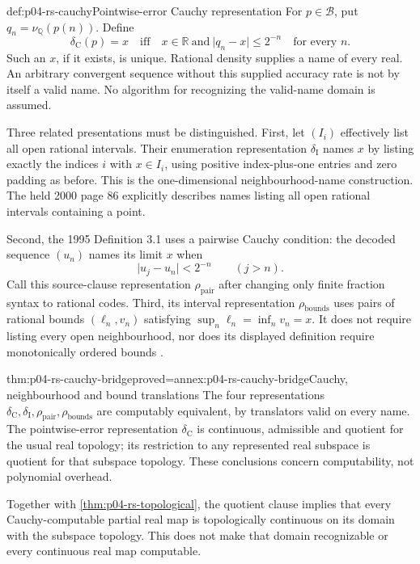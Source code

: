 \begin{hbdefinition}{def:p04-rs-cauchy}{Pointwise-error Cauchy representation}
For \(p\in\mathcal B\), put \(q_n=\nu_{\mathbb Q}(p(n))\).
Define
\[
 \delta_{\mathrm C}(p)=x
 \quad\text{iff}\quad
 x\in\mathbb R\ \text{and}\
 \lvert q_n-x\rvert\leq2^{-n}\quad\text{for every }n.
\]
Such an \(x\), if it exists, is unique. Rational density supplies
a name of every real. An arbitrary convergent sequence without
this supplied accuracy rate is not by itself a valid name.
No algorithm for recognizing the valid-name domain is assumed.
\end{hbdefinition}

Three related presentations must be distinguished.
First, let \((I_i)\) effectively list all open rational intervals.
Their enumeration representation \(\delta_{\mathrm I}\) names \(x\)
by listing exactly the indices \(i\) with \(x\in I_i\), using
positive index-plus-one entries and zero padding as before.
This is the one-dimensional neighbourhood-name construction.
The held 2000 page 86 explicitly describes names listing all
open rational intervals containing a point.

Second, the 1995 Definition 3.1 uses a pairwise Cauchy condition:
the decoded sequence \((u_n)\) names its limit \(x\) when
\[
 \lvert u_j-u_n\rvert<2^{-n}\qquad(j>n).
\]
Call this source-clause representation \(\rho_{\mathrm{pair}}\)
after changing only finite fraction syntax to rational codes.
Third, its interval representation \(\rho_{\mathrm{bounds}}\)
uses pairs of rational bounds \((\ell_n,v_n)\) satisfying
\(\sup_n\ell_n=\inf_n v_n=x\).
It does not require listing every open neighbourhood, nor does
its displayed definition require monotonically ordered bounds
\cite[pp.\ 19--20]{Weihrauch1995IntroductionRS}.

\begin{hbtheorem}{thm:p04-rs-cauchy-bridge}{proved=annex:p04-rs-cauchy-bridge}{Cauchy, neighbourhood and bound translations}
The four representations
\(\delta_{\mathrm C},\delta_{\mathrm I},
\rho_{\mathrm{pair}},\rho_{\mathrm{bounds}}\)
are computably equivalent, by translators valid on every name.
The pointwise-error representation \(\delta_{\mathrm C}\) is
continuous, admissible and quotient for the usual real topology;
its restriction to any represented real subspace is quotient
for that subspace topology.
These conclusions concern computability, not polynomial overhead.
\end{hbtheorem}

Together with \cref{thm:p04-rs-topological}, the quotient clause
implies that every Cauchy-computable partial real map is
topologically continuous on its domain with the subspace topology.
This does not make that domain recognizable or every continuous
real map computable.

